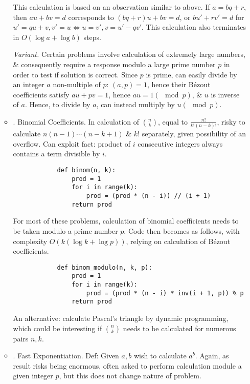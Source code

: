 \documentclass{article}
\begin{document}
\begin{itemize}
\begin{itemize}
		This calculation is based on an observation similar to above. If $a = bq + r$, then $au + bv = d$ corresponds to $(bq + r)u + bv = d$, or $bu' + rv' = d$ for $u' = qu + v,v' = u\Leftrightarrow u = v',v = u' - qv'$. This calculation also terminates in $O(\log a + \log b)$ steps.
		
		{\it Variant.} Certain problems involve calculation of extremely large numbers, \& consequently require a response modulo a large prime number $p$ in order to test if solution is correct. Since $p$ is prime, can easily divide by an integer $a$ non-multiple of $p$: $(a,p) = 1$, hence their B\'ezout coefficients satisfy $au + pv = 1$, hence $au = 1(\mod p)$, \& $u$ is inverse of $a$. Hence, to divide by $a$, can instead multiply by $u(\mod p)$.
		\item {. Binomial Coefficients.} In calculation of $\binom{n}{k}$, equal to $\frac{n!}{k!(n - k)!}$, risky to calculate $n(n - 1)\cdots(n - k + 1)$ \& $k!$ separately, given possibility of an overflow. Can exploit fact: product of $i$ consecutive integers always contains a term divisible by $i$.
		\begin{verbatim}
			def binom(n, k):
			    prod = 1
			    for i in range(k):
			        prod = (prod * (n - i)) // (i + 1)
			    return prod
		\end{verbatim}
		For most of these problems, calculation of binomial coefficients needs to be taken modulo a prime number $p$. Code then becomes as follows, with complexity $O(k(\log k + \log p))$, relying on calculation of B\'ezout coefficients.
		\begin{verbatim}
			def binom_modulo(n, k, p):
			    prod = 1
			    for i in range(k):
			        prod = (prod * (n - i) * inv(i + 1, p)) % p
			    return prod
		\end{verbatim}
		An alternative: calculate Pascal's triangle by dynamic programming, which could be interesting if $\binom{n}{k}$ needs to be calculated for numerous pairs $n,k$.
		\item {. Fast Exponentiation.} Def: Given $a,b$ wish to calculate $a^b$. Again, as result risks being enormous, often asked to perform calculation module a given integer $p$, but this does not change nature of problem.
		

\end{itemize}
\end{itemize}
\end{document}
